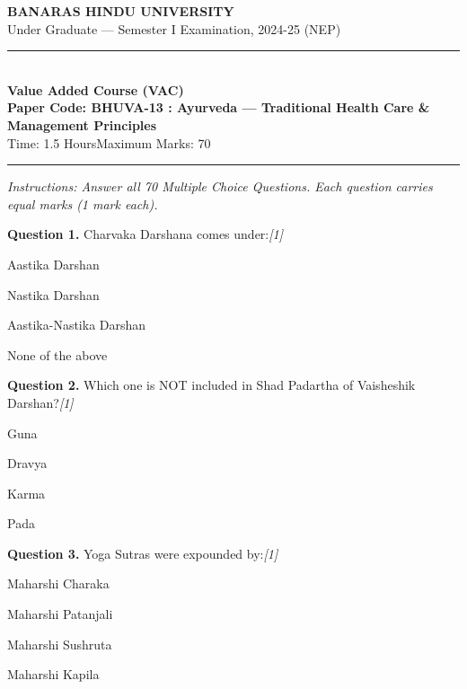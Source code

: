 \documentclass[11pt,a4paper]{article}
\newcommand{\pts}[1]{\hfill   \textit{[#1]}}
\begin{document}
\begin{center}
  {\large\bfseries BANARAS HINDU UNIVERSITY}\\[2pt]
  {\normalsize Under Graduate --- Semester I Examination, 2024-25 (NEP)}\\[6pt]
  \rule{0.8\linewidth}{0.5pt}\\[6pt]
  {\large\bfseries Value Added Course (VAC)}\\[4pt]
  {\large\bfseries Paper Code: BHUVA-13 : Ayurveda --- Traditional Health Care \& Management Principles}\\[4pt]
  {\normalsize Time: 1.5 Hours\hfill Maximum Marks: 70}
\end{center}

\rule{\linewidth}{0.4pt}

\smallskip



\noindent   \textit{Instructions: Answer all 70 Multiple Choice Questions. Each question carries equal marks (1 mark each).}

\bigskip




\noindent   \textbf{Question 1.} Charvaka Darshana comes under:\pts{1}

\begin{parts}
  \item Aastika Darshan
  \item Nastika Darshan
  \item Aastika-Nastika Darshan
  \item None of the above
\end{parts}

\medskip




\noindent   \textbf{Question 2.} Which one is NOT included in Shad Padartha of Vaisheshik Darshan?\pts{1}

\begin{parts}
  \item Guna
  \item Dravya
  \item Karma
  \item Pada
\end{parts}

\medskip




\noindent   \textbf{Question 3.} Yoga Sutras were expounded by:\pts{1}

\begin{parts}
  \item Maharshi Charaka
  \item Maharshi Patanjali
  \item Maharshi Sushruta
  \item Maharshi Kapila
\end{parts}
\end{document}
